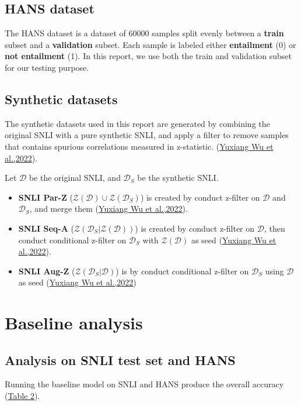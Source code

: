 \documentclass{article}
\begin{document}
\subsection{HANS dataset}
The HANS dataset is a dataset of 60000 samples split evenly between a \textbf{train} subset and a \textbf{validation} subset.
Each sample is labeled either \textbf{entailment} (0) or \textbf{not entailment} (1).
In this report, we use both the train and validation subset for our testing purpose.

\subsection{Synthetic datasets}
The synthetic datasets used in this report are generated by combining the original SNLI with a pure synthetic SNLI, and apply a filter to remove samples that contains spurious correlations measured in z-statistic. (\hyperref[ref2]{Yuxiang Wu et al.,2022}).

Let $\mathcal{D}$ be the original SNLI, and $\mathcal{D}_{S}$ be the synthetic SNLI.
\begin{itemize}
  \item \textbf{SNLI Par-Z} ({\it$\mathcal{Z}(\mathcal{D}) \cup \mathcal{Z}(\mathcal{D}_{S})$}) is created by conduct z-filter on $\mathcal{D}$ and $\mathcal{D}_{S}$, and merge them (\hyperref[ref2]{Yuxiang Wu et al.,2022}).
  \item \textbf{SNLI Seq-A} ({\it$\mathcal{Z}(\mathcal{D}_{S}|\mathcal{Z}(\mathcal{D}))$}) is created by conduct z-filter on $\mathcal{D}$, then conduct conditional z-filter on $\mathcal{D}_{S}$ with $\mathcal{Z}(\mathcal{D})$ as seed (\hyperref[ref2]{Yuxiang Wu et al.,2022}).
  \item \textbf{SNLI Aug-Z} ({\it $\mathcal{Z}(\mathcal{D}_{S}|\mathcal{D})$}) is by conduct conditional z-filter on  $\mathcal{D}_{S}$ using $\mathcal{D}$ as seed (\hyperref[ref2]{Yuxiang Wu et al.,2022})
\end{itemize}

\section{Baseline analysis}
\subsection{Analysis on SNLI test set and HANS}
Running the baseline model on SNLI and HANS produce the overall accuracy (\hyperref[table2]{Table 2}).
\end{document}
